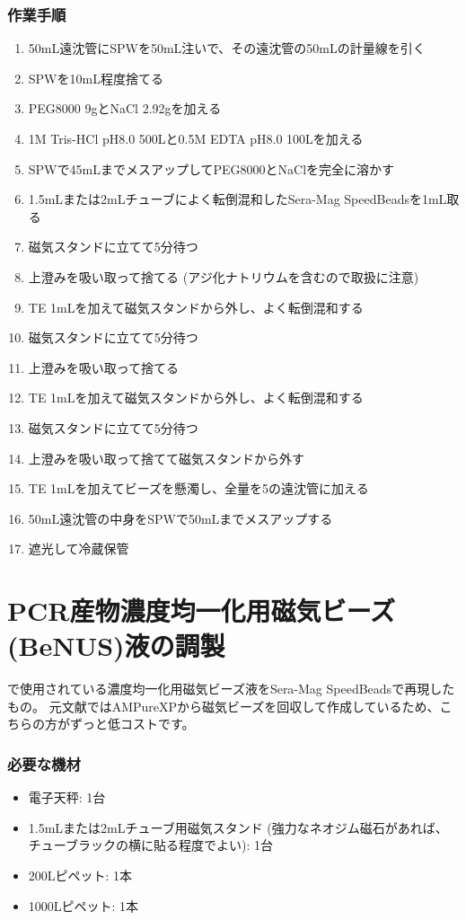 \documentclass[titlepage,10pt,a4paper]{jsbook}
\begin{document}
\subsubsection{作業手順}
\begin{enumerate}
\item 50mL遠沈管にSPWを50mL注いで、その遠沈管の50mLの計量線を引く
\item SPWを10mL程度捨てる
\item PEG8000 9gとNaCl 2.92gを加える
\item 1M Tris-HCl pH8.0 500{\textmu}Lと0.5M EDTA pH8.0 100{\textmu}Lを加える
\item SPWで45mLまでメスアップしてPEG8000とNaClを完全に溶かす
\item 1.5mLまたは2mLチューブによく転倒混和したSera-Mag SpeedBeadsを1mL取る
\item 磁気スタンドに立てて5分待つ
\item 上澄みを吸い取って捨てる (アジ化ナトリウムを含むので取扱に注意)
\item TE 1mLを加えて磁気スタンドから外し、よく転倒混和する
\item 磁気スタンドに立てて5分待つ
\item 上澄みを吸い取って捨てる
\item TE 1mLを加えて磁気スタンドから外し、よく転倒混和する
\item 磁気スタンドに立てて5分待つ
\item 上澄みを吸い取って捨てて磁気スタンドから外す
\item TE 1mLを加えてビーズを懸濁し、全量を5の遠沈管に加える
\item 50mL遠沈管の中身をSPWで50mLまでメスアップする
\item 遮光して冷蔵保管
\end{enumerate}

\section{PCR産物濃度均一化用磁気ビーズ(BeNUS)液の調製}\label{makingBeNUS}

\citet{Hosomichi2013,Hosomichi2014}で使用されている濃度均一化用磁気ビーズ液をSera-Mag SpeedBeadsで再現したもの。
元文献ではAMPureXPから磁気ビーズを回収して作成しているため、こちらの方がずっと低コストです。

\subsubsection{必要な機材}
\begin{itemize}
\item 電子天秤: 1台
\item 1.5mLまたは2mLチューブ用磁気スタンド (強力なネオジム磁石があれば、チューブラックの横に貼る程度でよい): 1台
\item 200{\textmu}Lピペット: 1本
\item 1000{\textmu}Lピペット: 1本
\end{itemize}
\end{document}
